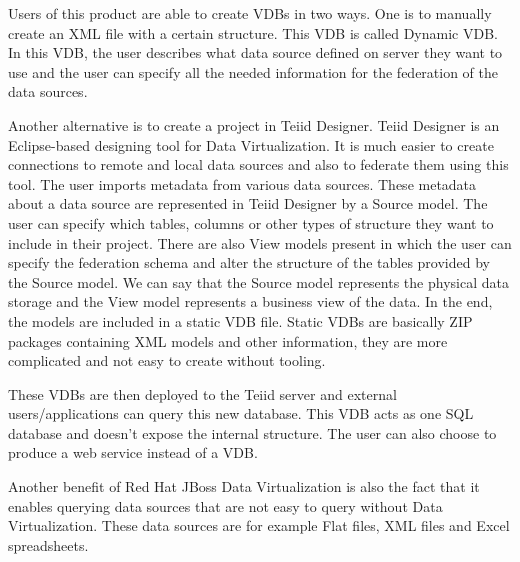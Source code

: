 \documentclass[12pt,oneside]{fithesis2}
\begin{document}
\par Users of this product are able to create VDBs in two ways. One is to manually create an XML file with a certain structure. This VDB is called Dynamic VDB. In this VDB, the user describes what data source defined on server they want to use and the user can specify all the needed information for the federation of the data sources. 
\par Another alternative is to create a project in Teiid Designer. Teiid Designer is an Eclipse-based designing tool for Data Virtualization. It is much easier to create connections to remote and local data sources and also to federate them using this tool. The user imports metadata from various data sources. These metadata about a data source are represented in Teiid Designer by a Source model. The user can specify which tables, columns or other types of structure they want to include in their project. There are also View models present in which the user can specify the federation schema and alter the structure of the tables provided by the Source model. We can say that the Source model represents the physical data storage and the View model represents a business view of the data. In the end, the models are included in a static VDB file. Static VDBs are basically ZIP packages containing XML models and other information, they are more complicated and not easy to create without tooling. 
\par These VDBs are then deployed to the Teiid server and external users/applications can query this new database. This VDB acts as one SQL database and doesn't expose the internal structure. The user can also choose to produce a web service instead of a VDB. 
\par Another benefit of Red Hat JBoss Data Virtualization is also the fact that it enables querying data sources that are not easy to query without Data Virtualization. These data sources are for example Flat files, XML files and Excel spreadsheets.
\end{document}
